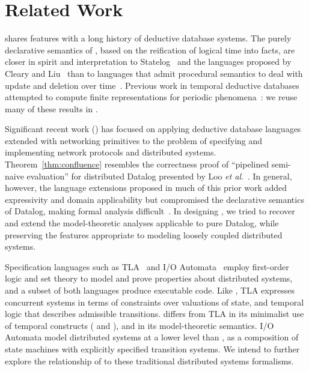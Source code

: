\section{Related Work}
\label{sec:relwork}

\lang shares features with a long history of deductive database systems.
The purely declarative semantics of \lang, based on the reification of logical time into
facts, are closer in spirit and interpretation to  Statelog~\cite{statelog} and
the languages proposed by Cleary and Liu~\cite{harmful,deductiveupdates,starlog} than
to languages that admit procedural semantics to deal with update 
and deletion over time~\cite{ldl, glue-nail}.
Previous work in temporal deductive databases attempted to compute finite representations for periodic phenomena~\cite{tdd-infinite}: we reuse many of these results in \lang.

Significant recent work (\cite{boom,Belaramani:2009,Chu:2007,Loo2009-CACM}) has focused on applying deductive database languages extended with networking 
primitives to the problem of specifying and implementing network protocols and distributed systems.  Theorem~\ref{thm:confluence} resembles the  correctness proof of ``pipelined
semi-naive evaluation'' for distributed Datalog presented by Loo \emph{et al}.~\cite{loo-sigmod06}.
In general, however, the language extensions 
proposed in much of this prior work added
expressivity and domain applicability but compromised the declarative
semantics of Datalog, making formal analysis difficult~\cite{Mao2009, navarro-oper-sem}.
In designing \lang, we tried to recover and extend the model-theoretic analyses applicable
to pure Datalog, while preserving the features appropriate to modeling loosely coupled
distributed systems.

Specification languages such as TLA~\cite{tla} and I/O Automata~\cite{ioa} employ
first-order logic and set theory to model and prove properties about distributed
systems, and a subset of both languages produce executable code.  Like \lang,
TLA expresses concurrent systems in terms of constraints over valuations of
state, and temporal logic that describes admissible transitions.  \lang differs
from TLA in its minimalist use of temporal constructs ( and
), and in its model-theoretic semantics.  I/O Automata model
distributed systems at a lower level than \lang, as a composition of state
machines with explicitly specified transition systems.  We intend to further
explore the relationship of \lang to these traditional distributed systems
formalisms.

